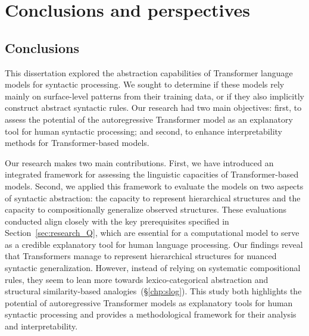 \chapter{Conclusions and perspectives}

\section{Conclusions}

This dissertation explored the abstraction capabilities of Transformer language models for syntactic processing. We sought to determine if these models rely mainly on surface-level patterns from their training data, or if they also implicitly construct abstract syntactic rules. Our research had two main objectives: first, to assess the potential of the autoregressive Transformer model as an explanatory tool for human syntactic processing; and second, to enhance interpretability methods for Transformer-based models. 

Our research makes two main contributions. First, we have introduced an integrated framework for assessing the linguistic capacities of Transformer-based models. Second, we applied this framework to evaluate the models on two aspects of syntactic abstraction: the capacity to represent hierarchical structures and the capacity to compositionally generalize observed structures. These evaluations conducted align closely with the key prerequisites specified in Section~\ref{sec:research_Q}, which are essential for a computational model to serve as a credible explanatory tool for human language processing. Our findings reveal that Transformers manage to represent hierarchical structures for nuanced syntactic generalization. However, instead of relying on systematic compositional rules, they seem to lean more towards lexico-categorical abstraction and structural similarity-based analogies~(\S\ref{chp:slog}).  
This study both highlights the potential of autoregressive Transformer models as explanatory tools for human syntactic processing and provides a methodological framework for their analysis and interpretability.


